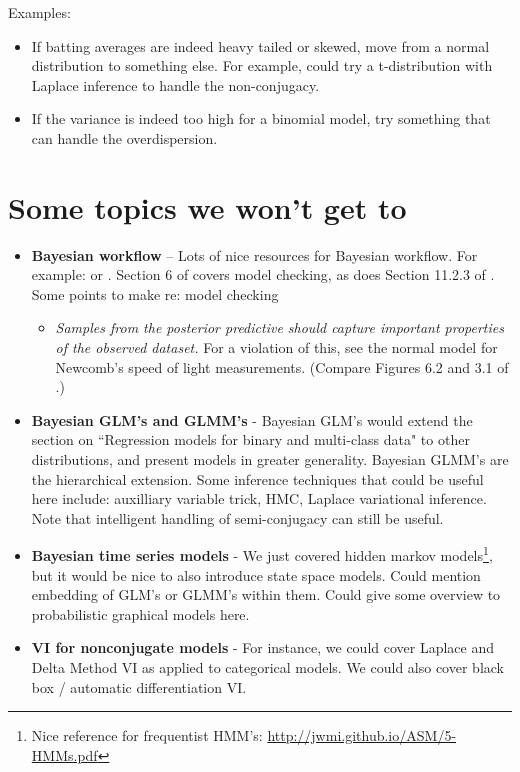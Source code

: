 \documentclass{article} %
\begin{document}
Examples:
\begin{itemize}
\item If batting averages are indeed heavy tailed or skewed,  move from a normal distribution to something else.   For example,  could try a t-distribution with Laplace inference to handle the non-conjugacy. 
\item If the variance is indeed too high for a binomial model,  try something that can handle the overdispersion. 
\end{itemize}

\section{Some topics we won't get to}

\begin{itemize}
\item \textbf{Bayesian workflow} -- Lots of nice resources for Bayesian workflow.    For example: \cite{gelman2020bayesian} or \cite{gabry2019visualization}.   Section 6 of \cite{gelman2013bayesian} covers model checking,  as does  Section 11.2.3 of \cite{davison2003statistical}.    Some points to make re: model checking
	\begin{itemize}
	\item \textit{Samples from the posterior predictive should capture important properties of the observed dataset.}  For a violation of this,  see the normal model for Newcomb's speed of light measurements.  (Compare Figures 6.2 and 3.1 of \cite{gelman2013bayesian}.)
	\end{itemize}
\item \textbf{Bayesian GLM's and GLMM's} - Bayesian GLM's would extend the section on ``Regression models for binary and multi-class data" to other distributions, and present models in greater generality.  Bayesian GLMM's are the hierarchical extension.  Some inference techniques that could be useful here include:  auxilliary variable trick, HMC, Laplace variational inference. Note that intelligent handling of semi-conjugacy can still be useful.
\item \textbf{Bayesian time series models} -  We just covered hidden markov models\footnote{Nice reference for frequentist HMM's: \url{http://jwmi.github.io/ASM/5-HMMs.pdf}}, but it would be nice to also introduce state space models.    Could mention embedding of GLM's or GLMM's within them.   Could give some overview to probabilistic graphical models here. 
\item \textbf{VI for nonconjugate models} - For instance, we could cover Laplace and Delta Method VI as applied to categorical models.   We could also cover black box / automatic differentiation VI.
\end{itemize}
\end{document}
